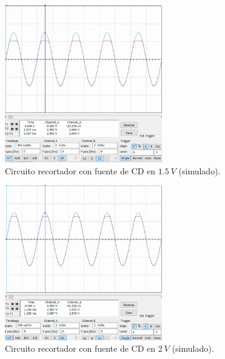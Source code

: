 \documentclass[journal]{IEEEtran}
\begin{document}
\begin{figure}[H]
        \centering
        \includegraphics[width=2.7in]{SignalSimulated_08.png}
        \caption{Circuito recortador con fuente de CD en $1.5~V$ (simulado).}
        \label{fig:SignalSimulated_08}
\end{figure}
\begin{figure}[H]
        \centering
        \includegraphics[width=2.7in]{SignalSimulated_09.png}
        \caption{Circuito recortador con fuente de CD en $2~V$ (simulado).}
        \label{fig:SignalSimulated_09}
\end{figure}
\end{document}
